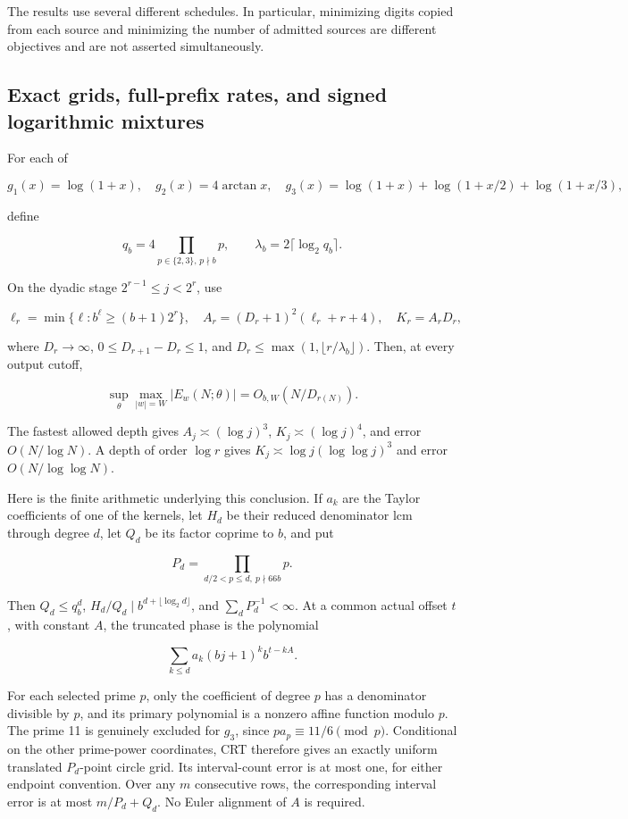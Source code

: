 \documentclass[11pt,a4paper]{article}
\begin{document}
The results use several different schedules. In particular, minimizing
digits copied from each source and minimizing the number of admitted
sources are different objectives and are not asserted simultaneously.

\subsection{Exact grids, full-prefix rates, and signed logarithmic
mixtures}\label{exact-grids-full-prefix-rates-and-signed-logarithmic-mixtures}

For each of

\[
g_1(x)=\log(1+x),\quad g_2(x)=4\arctan x,\quad
g_3(x)=\log(1+x)+\log(1+x/2)+\log(1+x/3),
\]

define

\[
q_b=4\!\prod_{p\in\lbrace 2,3\rbrace ,\,p\nmid b}p,
\qquad \lambda_b=2\lceil\log_2q_b\rceil.
\]

On the dyadic stage \(2^{r-1}\le j< 2^r\), use

\[
\ell_r=\min\lbrace \ell:b^\ell\ge(b+1)2^r\rbrace ,\quad
A_r=(D_r+1)^2(\ell_r+r+4),\quad K_r=A_rD_r,
\]

where \(D_r\to\infty\), \(0\le D_{r+1}-D_r\le1\), and
\(D_r\le\max(1,\lfloor r/\lambda_b\rfloor)\). Then, at every output
cutoff,

\[
\sup_\theta\max_{|w|=W}|E_w(N;\theta)|
       =O_{b,W}(N/D_{r(N)}).
\tag{R1}
\]

The fastest allowed depth gives \(A_j\asymp(\log j)^3\),
\(K_j\asymp(\log j)^4\), and error \(O(N/\log N)\). A depth of order
\(\log r\) gives \(K_j\asymp\log j(\log\log j)^3\) and error
\(O(N/\log\log N)\).

Here is the finite arithmetic underlying this conclusion. If \(a_k\) are
the Taylor coefficients of one of the kernels, let \(H_d\) be their
reduced denominator lcm through degree \(d\), let \(Q_d\) be its factor
coprime to \(b\), and put

\[
P_d=\prod_{d/2< p\le d,\ p\nmid66b}p.
\]

Then \(Q_d\le q_b^d\), \(H_d/Q_d\mid b^{d+\lfloor\log_2d\rfloor}\), and
\(\sum_dP_d^{-1}< \infty\). At a common actual offset \(t\), with
constant \(A\), the truncated phase is the polynomial

\[
\sum_{k\le d}a_k(bj+1)^kb^{t-kA}.
\]

For each selected prime \(p\), only the coefficient of degree \(p\) has
a denominator divisible by \(p\), and its primary polynomial is a
nonzero affine function modulo \(p\). The prime 11 is genuinely excluded
for \(g_3\), since \(pa_p\equiv11/6\pmod p\). Conditional on the other
prime-power coordinates, CRT therefore gives an exactly uniform
translated \(P_d\)-point circle grid. Its interval-count error is at
most one, for either endpoint convention. Over any \(m\) consecutive
rows, the corresponding interval error is at most \(m/P_d+Q_d\). No
Euler alignment of \(A\) is required.
\end{document}

